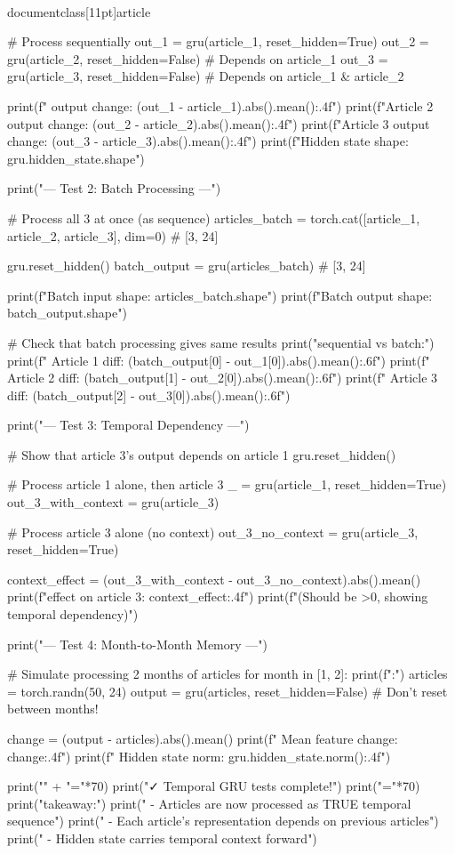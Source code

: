 \\documentclass[11pt]{article}
\begin{document}
\begin{CodeBlock}
    # Process sequentially
    out_1 = gru(article_1, reset_hidden=True)
    out_2 = gru(article_2, reset_hidden=False)  # Depends on article_1
    out_3 = gru(article_3, reset_hidden=False)  # Depends on article_1 & article_2
    
    print(f" output change: {(out_1 - article_1).abs().mean():.4f}")
    print(f"Article 2 output change: {(out_2 - article_2).abs().mean():.4f}")
    print(f"Article 3 output change: {(out_3 - article_3).abs().mean():.4f}")
    print(f"Hidden state shape: {gru.hidden_state.shape}")
    
    print("\n--- Test 2: Batch Processing ---")
    
    # Process all 3 at once (as sequence)
    articles_batch = torch.cat([article_1, article_2, article_3], dim=0)  # [3, 24]
    
    gru.reset_hidden()
    batch_output = gru(articles_batch)  # [3, 24]
    
    print(f"Batch input shape: {articles_batch.shape}")
    print(f"Batch output shape: {batch_output.shape}")
    
    # Check that batch processing gives same results
    print("\nComparing sequential vs batch:")
    print(f"  Article 1 diff: {(batch_output[0] - out_1[0]).abs().mean():.6f}")
    print(f"  Article 2 diff: {(batch_output[1] - out_2[0]).abs().mean():.6f}")
    print(f"  Article 3 diff: {(batch_output[2] - out_3[0]).abs().mean():.6f}")
    
    print("\n--- Test 3: Temporal Dependency ---")
    
    # Show that article 3's output depends on article 1
    gru.reset_hidden()
    
    # Process article 1 alone, then article 3
    _ = gru(article_1, reset_hidden=True)
    out_3_with_context = gru(article_3)
    
    # Process article 3 alone (no context)
    out_3_no_context = gru(article_3, reset_hidden=True)
    
    context_effect = (out_3_with_context - out_3_no_context).abs().mean()
    print(f"\nContext effect on article 3: {context_effect:.4f}")
    print(f"(Should be >0, showing temporal dependency)")
    
    print("\n--- Test 4: Month-to-Month Memory ---")
    
    # Simulate processing 2 months of articles
    for month in [1, 2]:
        print(f":")
        articles = torch.randn(50, 24)
        output = gru(articles, reset_hidden=False)  # Don't reset between months!
        
        change = (output - articles).abs().mean()
        print(f"  Mean feature change: {change:.4f}")
        print(f"  Hidden state norm: {gru.hidden_state.norm():.4f}")
    
    print("\n" + "="*70)
    print("✓ Temporal GRU tests complete!")
    print("="*70)
    print("\nKey takeaway:")
    print("  - Articles are now processed as TRUE temporal sequence")
    print("  - Each article's representation depends on previous articles")
    print("  - Hidden state carries temporal context forward")

\end{CodeBlock}
\end{document}
